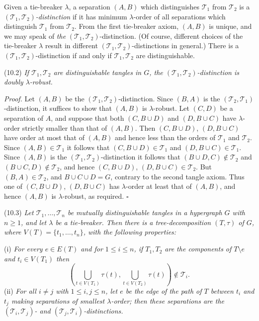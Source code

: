 Given a tie-breaker $\lambda$, a separation $(A, B)$ which distinguishes $\mathscr{T}_1$ from $\mathscr{T}_2$ is a \textit{$(\mathscr{T}_1, \mathscr{T}_2)$-distinction} if it has minimum $\lambda$-order of all separations which distinguish $\mathscr{T}_1$ from $\mathscr{T}_2$. From the first tie-breaker axiom, $(A, B)$ is unique, and we may speak of \textit{the} $(\mathscr{T}_1, \mathscr{T}_2)$-distinction. (Of course, different choices of the tie-breaker $\lambda$ result in different $(\mathscr{T}_1, \mathscr{T}_2)$-distinctions in general.) There is a $(\mathscr{T}_1, \mathscr{T}_2)$-distinction if and only if $\mathscr{T}_1, \mathscr{T}_2$ are distinguishable.

\stmt
(10.2) \textit{If $\mathscr{T}_1, \mathscr{T}_2$ are distinguishable tangles in $G$, the $(\mathscr{T}_1, \mathscr{T}_2)$-distinction is doubly $\lambda$-robust.}

\textit{Proof.} Let $(A, B)$ be the $(\mathscr{T}_1, \mathscr{T}_2)$-distinction. Since $(B, A)$ is the $(\mathscr{T}_2, \mathscr{T}_1)$-distinction, it suffices to show that $(A, B)$ is $\lambda$-robust. Let $(C, D)$ be a separation of $A$, and suppose that both $(C, B \cup D)$ and $(D, B \cup C)$ have $\lambda$-order strictly smaller than that of $(A, B)$. Then $(C, B \cup D)$, $(D, B \cup C)$ have order at most that of $(A, B)$ and hence less than the orders of $\mathscr{T}_1$ and $\mathscr{T}_2$. Since $(A, B) \in \mathscr{T}_1$ it follows that $(C, B \cup D) \in \mathscr{T}_1$ and $(D, B \cup C) \in \mathscr{T}_1$. Since $(A, B)$ is the $(\mathscr{T}_1, \mathscr{T}_2)$-distinction it follows that $(B \cup D, C) \notin \mathscr{T}_2$ and $(B \cup C, D) \notin \mathscr{T}_2$, and hence $(C, B \cup D)$, $(D, B \cup C) \in \mathscr{T}_2$. But $(B, A) \in \mathscr{T}_2$, and $B \cup C \cup D = G$, contrary to the second tangle axiom. Thus one of $(C, B \cup D)$, $(D, B \cup C)$ has $\lambda$-order at least that of $(A, B)$, and hence $(A, B)$ is $\lambda$-robust, as required. $\square$

\stmt
(10.3) \textit{Let $\mathscr{T}_1, \dots, \mathscr{T}_n$ be mutually distinguishable tangles in a hypergraph $G$ with $n \ge 1$, and let $\lambda$ be a tie-breaker. Then there is a tree-decomposition $(T, \tau)$ of $G$, where $V(T) = \{t_1, \dots, t_n\}$, with the following properties:}

\hspace*{12pt}(i) \textit{For every $e \in E(T)$ and for $1 \le i \le n$, if $T_1, T_2$ are the components of $T \setminus e$ and $t_i \in V(T_1)$ then}
\begin{equation*}
\left( \bigcup_{t \in V(T_1)} \tau(t), \bigcup_{t \in V(T_2)} \tau(t) \right) \notin \mathscr{T}_i.
\end{equation*}
\hspace*{12pt}(ii) \textit{For all $i \ne j$ with $1 \le i, j \le n$, let $e$ be the edge of the path of $T$ between $t_i$ and $t_j$ making separations of smallest $\lambda$-order; then these separations are the $(\mathscr{T}_i, \mathscr{T}_j)$- and $(\mathscr{T}_j, \mathscr{T}_i)$-distinctions.}

